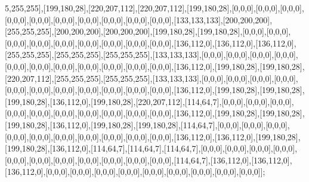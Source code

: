 5,255,255],[199,180,28],[220,207,112],[220,207,112],[199,180,28],[0,0,0],[0,0,0],[0,0,0],[0,0,0],[0,0,0],[0,0,0],[0,0,0],[0,0,0],[0,0,0],[0,0,0],[133,133,133],[200,200,200],[255,255,255],[200,200,200],[200,200,200],[199,180,28],[199,180,28],[0,0,0],[0,0,0],[0,0,0],[0,0,0],[0,0,0],[0,0,0],[0,0,0],[0,0,0],[0,0,0],[136,112,0],[136,112,0],[136,112,0],[255,255,255],[255,255,255],[255,255,255],[133,133,133],[0,0,0],[0,0,0],[0,0,0],[0,0,0],[0,0,0],[0,0,0],[0,0,0],[0,0,0],[0,0,0],[0,0,0],[0,0,0],[136,112,0],[199,180,28],[199,180,28],[220,207,112],[255,255,255],[255,255,255],[133,133,133],[0,0,0],[0,0,0],[0,0,0],[0,0,0],[0,0,0],[0,0,0],[0,0,0],[0,0,0],[0,0,0],[0,0,0],[0,0,0],[136,112,0],[199,180,28],[199,180,28],[199,180,28],[136,112,0],[199,180,28],[220,207,112],[114,64,7],[0,0,0],[0,0,0],[0,0,0],[0,0,0],[0,0,0],[0,0,0],[0,0,0],[0,0,0],[0,0,0],[0,0,0],[136,112,0],[199,180,28],[199,180,28],[199,180,28],[136,112,0],[199,180,28],[199,180,28],[114,64,7],[0,0,0],[0,0,0],[0,0,0],[0,0,0],[0,0,0],[0,0,0],[0,0,0],[0,0,0],[0,0,0],[0,0,0],[136,112,0],[136,112,0],[199,180,28],[199,180,28],[136,112,0],[114,64,7],[114,64,7],[114,64,7],[0,0,0],[0,0,0],[0,0,0],[0,0,0],[0,0,0],[0,0,0],[0,0,0],[0,0,0],[0,0,0],[0,0,0],[0,0,0],[114,64,7],[136,112,0],[136,112,0],[136,112,0],[0,0,0],[0,0,0],[0,0,0],[0,0,0],[0,0,0],[0,0,0],[0,0,0],[0,0,0],[0,0,0]];

